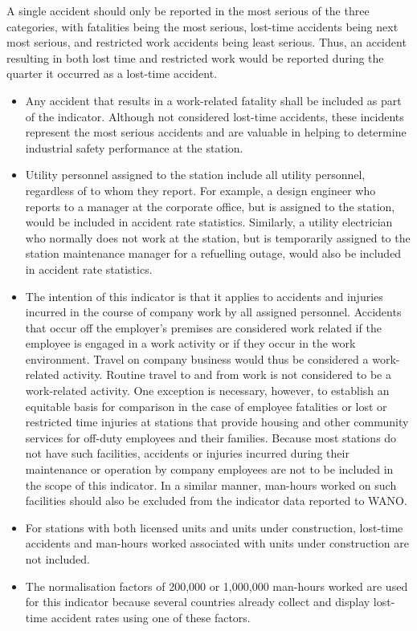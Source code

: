 A single accident should only be reported in the most serious of the
three categories, with fatalities being the most serious, lost-time
accidents being next most serious, and restricted work accidents being
least serious. Thus, an accident resulting in both lost time and
restricted work would be reported during the quarter it occurred as a
lost-time accident.
\begin{itemize}
\item Any accident that results in a work-related fatality shall be included as part of the indicator. Although not considered lost-time accidents, these incidents represent the most serious accidents and are valuable in helping to determine industrial safety performance at the station.
\item Utility personnel assigned to the station include all utility personnel, regardless of to whom they report. For example, a design engineer who reports to a manager at the corporate office, but is assigned to the station, would be included in accident rate statistics. Similarly, a utility electrician who normally does not work at the station, but is temporarily assigned to the station maintenance manager for a refuelling outage, would also be included in accident rate statistics.
\item The intention of this indicator is that it applies to accidents and injuries incurred in the course of company work by all assigned personnel. Accidents that occur off the employer's premises are considered work related if the employee is engaged in a work activity or if they occur in the work environment. Travel on company business would thus be considered a work-related activity.
Routine travel to and from work is not considered to be a work-related activity. One exception is necessary, however,  to establish an equitable basis for comparison in the case of employee fatalities or lost or restricted time injuries at stations that provide housing and other community services for off-duty employees and their families. Because most stations do not have such facilities, accidents or injuries incurred during their maintenance or operation by company employees are not to be included in the scope of this indicator.  In a similar manner, man-hours worked on such facilities should also be excluded from the indicator data reported to WANO.
\item For stations with both licensed units and units under construction, lost-time accidents and man-hours worked associated with units under construction are not included.
\item The normalisation factors of 200,000 or 1,000,000 man-hours worked are used for this indicator because several countries already collect and display lost-time accident rates using one of these factors.

\end{itemize}
